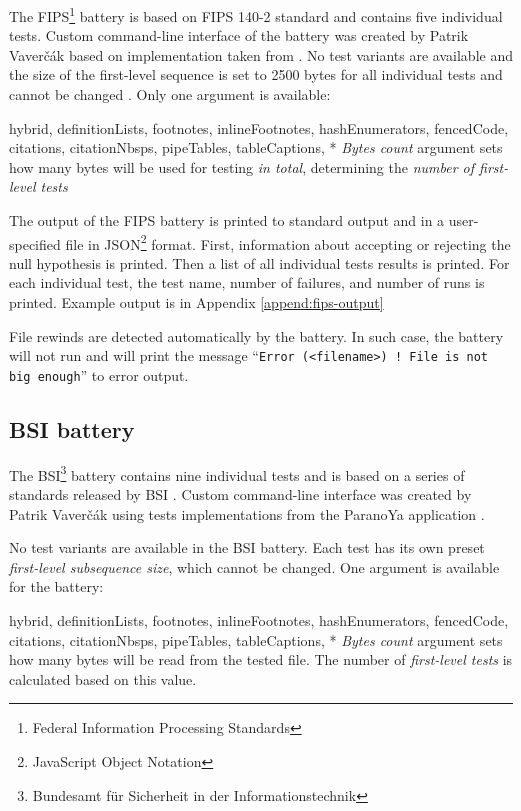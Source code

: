 \documentclass[
  digital,     %
  oneside,     %
  nosansbold,  %
  nocolorbold, %
  nolof,         %
  nolot,         %
]{fithesis4}
\begin{document}
The FIPS\footnote{Federal Information Processing Standards} battery is based on FIPS 140-2 standard \cite{fips_stand} and contains five individual tests. Custom command-line interface of the battery \cite{rtt-py-batteries} was created by Patrik Vaverčák based on implementation taken from \cite{fips-site}. No test variants are available and the size of the first-level sequence is set to 2500 bytes for all individual tests and cannot be changed \cite[p. 20]{vavercak}. Only one argument is available:
\begin{markdown*}{%
  hybrid,
  definitionLists,
  footnotes,
  inlineFootnotes,
  hashEnumerators,
  fencedCode,
  citations,
  citationNbsps,
  pipeTables,
  tableCaptions,
}
* \emph{Bytes count} argument sets how many bytes will be used for testing \emph{in total}, determining the \emph{number of first-level tests} %
\end{markdown*}

The output of the FIPS battery is printed to standard output and in a user-specified file in JSON\footnote{JavaScript Object Notation} format. First, information about accepting or rejecting the null hypothesis is printed. Then a list of all individual tests results is printed. For each individual test, the test name, number of failures, and number of runs is printed. Example output is in Appendix \ref{append:fips-output}

File rewinds are detected automatically by the battery. In such case, the battery will not run and will print the message ``\texttt{Error (<filename>) ! File is not big enough}'' to error output.

\subsection{BSI battery} \label{chap:sols-bsi}
The BSI\footnote{Bundesamt für Sicherheit in der Informationstechnik} battery contains nine individual tests and is based on a series of standards released by BSI \cite{bsi_stand}. Custom command-line interface \cite{rtt-py-batteries} was created by Patrik Vaverčák using tests implementations from the ParanoYa application \cite[p. 16]{vavercak}.

No test variants are available in the BSI battery. Each test has its own preset \emph{first-level subsequence size}, which cannot be changed. One argument is available for the battery:
\begin{markdown*}{%
  hybrid,
  definitionLists,
  footnotes,
  inlineFootnotes,
  hashEnumerators,
  fencedCode,
  citations,
  citationNbsps,
  pipeTables,
  tableCaptions,
}
* \emph{Bytes count} argument sets how many bytes will be read from the tested file. The number of \emph{first-level tests} is calculated based on this value.
\end{markdown*}
\end{document}
